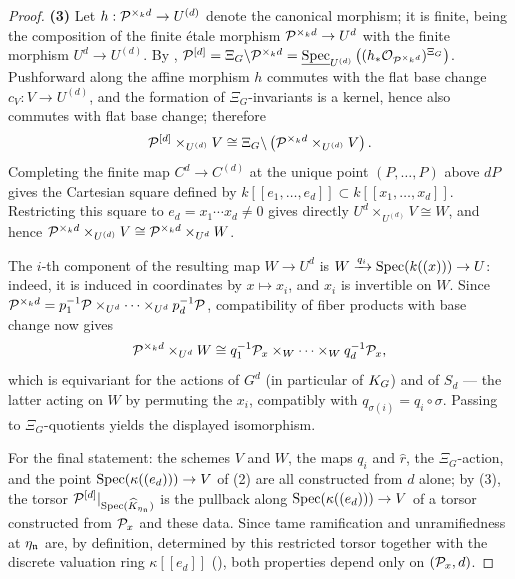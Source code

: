 \begin{proof}
    \textbf{(3)} Let $h : \mathcal{P}^{\times_k d} \to U^{(d)}$ denote the canonical morphism; it is finite, being the composition
    of the finite étale morphism $\mathcal{P}^{\times_k d} \to U^d$ with the finite morphism $U^d \to U^{(d)}$. By
    ,
    $\mathcal{P}^{[d]} = \Xi_G \backslash \mathcal{P}^{\times_k d} = \underline{\operatorname{Spec}}_{U^{(d)}}\left((h_* \mathcal{O}_{\mathcal{P}^{\times_k d}})^{\Xi_G}\right)$.
    Pushforward along the affine morphism $h$ commutes with the flat base change $c_V : V \to U^{(d)}$, and the formation of
    $\Xi_G$-invariants is a kernel, hence also commutes with flat base change; therefore
    $$ \mathcal{P}^{[d]} \times_{U^{(d)}} V \cong \Xi_G \backslash \left(\mathcal{P}^{\times_k d} \times_{U^{(d)}} V\right).$$
    Completing the finite map $C^d\to C^{(d)}$ at the unique point
    $(P,\dots,P)$ above $dP$ gives the Cartesian square defined by
    $k[[e_1,\dots,e_d]]\subset k[[x_1,\dots,x_d]]$.  Restricting this square
    to $e_d=x_1\cdots x_d\ne0$ gives directly
    $U^d\times_{U^{(d)}}V\cong W$, and hence
    $\mathcal{P}^{\times_k d}\times_{U^{(d)}}V
      \cong\mathcal{P}^{\times_k d}\times_{U^d}W$.

    The $i$-th component of the resulting map $W\to U^d$ is
    $W\xrightarrow{q_i}\operatorname{Spec}(k((x)))\to U$: indeed, it is induced in
    coordinates by $x\mapsto x_i$, and $x_i$ is invertible on $W$.
    Since
    $\mathcal{P}^{\times_k d}=p_1^{-1}\mathcal{P}\times_{U^d}\cdots\times_{U^d}p_d^{-1}\mathcal{P}$,
    compatibility of fiber products with base change now gives
    $$ \mathcal{P}^{\times_k d} \times_{U^d} W \cong q_1^{-1}\mathcal{P}_x \times_W \cdots \times_W q_d^{-1}\mathcal{P}_x, $$
    which is equivariant for the actions of $G^d$ (in particular of $K_{G}$) and of $S_d$ --- the latter acting on $W$ by
    permuting the $x_i$, compatibly with $q_{\sigma(i)} = q_i \circ \sigma$. Passing to $\Xi_G$-quotients yields the displayed
    isomorphism.

    For the final statement: the schemes $V$ and $W$, the maps $q_i$ and $\hat{r}$, the $\Xi_G$-action, and the point
    $\operatorname{Spec}(\kappa((e_d))) \to V$ of (2) are all constructed from $d$ alone; by (3), the torsor
    $\mathcal{P}^{[d]}|_{\operatorname{Spec}(\widehat{K}_{\eta_{\mathfrak{n}}})}$ is the pullback along $\operatorname{Spec}(\kappa((e_d))) \to V$ of a torsor constructed
    from $\mathcal{P}_x$ and these data. Since tame ramification and unramifiedness at
    $\eta_{\mathfrak{n}}$ are, by definition, determined by this restricted torsor
    together with the discrete valuation ring $\kappa[[e_d]]$
    (), both properties depend only
    on $(\mathcal{P}_x,d)$.
\end{proof}

